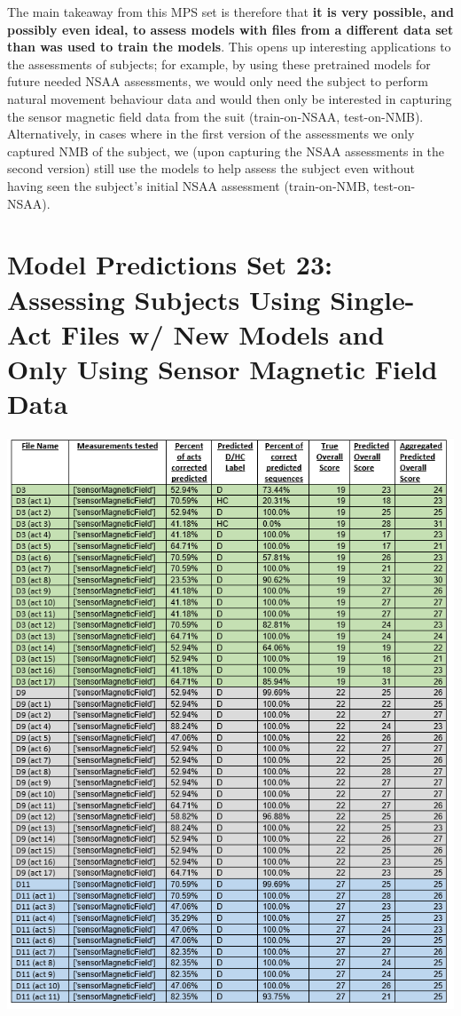 \documentclass[12pt,twoside]{report}
\begin{document}
\quad The main takeaway from this MPS set is therefore that \textbf{it is very possible, and possibly even ideal, to assess models with files from a different data set than was used to train the models}. This opens up interesting applications to the assessments of subjects; for example, by using these pretrained models for future needed NSAA assessments, we would only need the subject to perform natural movement behaviour data and would then only be interested in capturing the sensor magnetic field data from the suit (train-on-NSAA, test-on-NMB). Alternatively, in cases where in the first version of the assessments we only captured NMB of the subject, we (upon capturing the NSAA assessments in the second version) still use the models to help assess the subject even without having seen the subject’s initial NSAA assessment (train-on-NMB, test-on-NSAA).




\section{Model Predictions Set 23: Assessing Subjects Using Single-Act Files w/ New Models and Only Using Sensor Magnetic Field Data}

\begin{center}
\includegraphics[scale=0.8]{project_figures/fig11_32}
\end{center}
\end{document}
